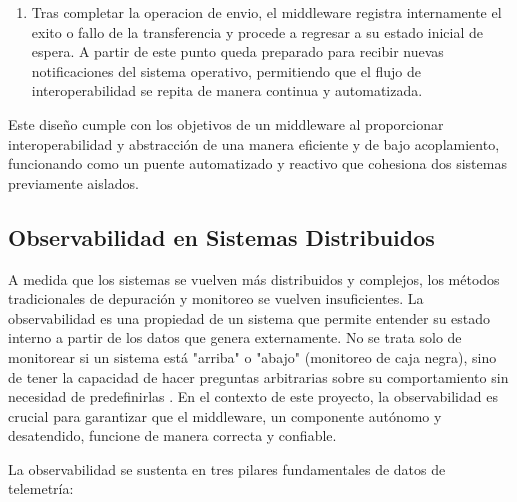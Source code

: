 \begin{enumerate}
	\item Tras completar la operacion de envio, el middleware registra internamente el exito o fallo de la transferencia y procede a regresar a su estado inicial de espera. A partir de este punto queda preparado para recibir nuevas notificaciones del sistema operativo, permitiendo que el flujo de interoperabilidad se repita de manera continua y automatizada.
\end{enumerate}

Este diseño cumple con los objetivos de un middleware al proporcionar interoperabilidad y abstracción de una manera eficiente y de bajo acoplamiento, funcionando como un puente automatizado y reactivo que cohesiona dos sistemas previamente aislados.

\subsection{Observabilidad en Sistemas Distribuidos}
A medida que los sistemas se vuelven más distribuidos y complejos, los métodos tradicionales de depuración y monitoreo se vuelven insuficientes. La observabilidad es una propiedad de un sistema que permite entender su estado interno a partir de los datos que genera externamente. No se trata solo de monitorear si un sistema está "arriba" o "abajo" (monitoreo de caja negra), sino de tener la capacidad de hacer preguntas arbitrarias sobre su comportamiento sin necesidad de predefinirlas \cite{majors2022observability}. En el contexto de este proyecto, la observabilidad es crucial para garantizar que el middleware, un componente autónomo y desatendido, funcione de manera correcta y confiable.

La observabilidad se sustenta en tres pilares fundamentales de datos de telemetría:

